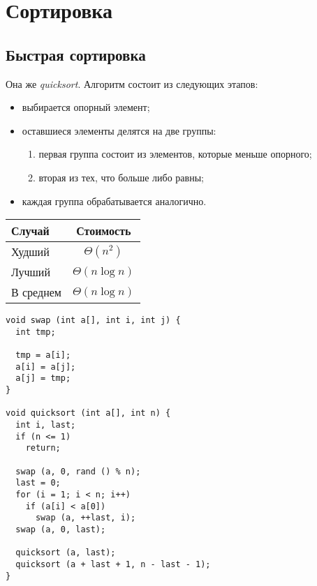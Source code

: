 \section{Сортировка}
\label{sec:sorting}

\subsection{Быстрая сортировка}

Она же \emph{quicksort}. Алгоритм состоит из следующих этапов:
\begin{itemize}
  \item выбирается опорный элемент;
  \item оставшиеся элементы делятся на две группы:
    \begin{enumerate}
      \item первая группа состоит из элементов, которые меньше опорного;
      \item вторая из тех, что больше либо равны;
    \end{enumerate}
  \item каждая группа обрабатывается аналогично.
\end{itemize}

\begin{center}
  \begin{tabular}{lc}
    \toprule
    Случай & Стоимость \\
    \midrule
    Худший & $\Theta(n^2)$ \\
    Лучший & $\Theta(n \log n)$ \\
    В среднем & $\Theta(n \log n)$ \\
    \bottomrule
  \end{tabular}
\end{center}

\lstset{label=lst:qsort,caption=Реализация}
\begin{lstlisting}
void swap (int a[], int i, int j) {
  int tmp;

  tmp = a[i];
  a[i] = a[j];
  a[j] = tmp;
}

void quicksort (int a[], int n) {
  int i, last;
  if (n <= 1)
    return;

  swap (a, 0, rand () % n);
  last = 0;
  for (i = 1; i < n; i++)
    if (a[i] < a[0])
      swap (a, ++last, i);
  swap (a, 0, last);

  quicksort (a, last);
  quicksort (a + last + 1, n - last - 1);
}
\end{lstlisting}

